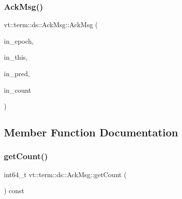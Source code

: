 \mbox{\label{structvt_1_1term_1_1ds_1_1_ack_msg_afa493ae15ad599ef9ed892ab697345d5}} 
\subsubsection{\texorpdfstring{Ack\+Msg()}{AckMsg()}\hspace{0.1cm}{\footnotesize\ttfamily [2/2]}}
{\footnotesize\ttfamily vt\+::term\+::ds\+::\+Ack\+Msg\+::\+Ack\+Msg (\begin{DoxyParamCaption}\item[{\hyperlink{namespacevt_a985a5adf291c34a3ca263b3378388236}{Epoch\+Type} const \&}]{in\+\_\+epoch,  }\item[{\hyperlink{namespacevt_a866da9d0efc19c0a1ce79e9e492f47e2}{Node\+Type} const \&}]{in\+\_\+this,  }\item[{\hyperlink{namespacevt_a866da9d0efc19c0a1ce79e9e492f47e2}{Node\+Type} const \&}]{in\+\_\+pred,  }\item[{int64\+\_\+t const}]{in\+\_\+count }\end{DoxyParamCaption})\hspace{0.3cm}{\ttfamily [inline]}}



\subsection{Member Function Documentation}
\mbox{\label{structvt_1_1term_1_1ds_1_1_ack_msg_a28125b7b99d15c26ebaef2c34f6a5daa}} 
\subsubsection{\texorpdfstring{get\+Count()}{getCount()}}
{\footnotesize\ttfamily int64\+\_\+t vt\+::term\+::ds\+::\+Ack\+Msg\+::get\+Count (\begin{DoxyParamCaption}{ }\end{DoxyParamCaption}) const\hspace{0.3cm}{\ttfamily [inline]}}

